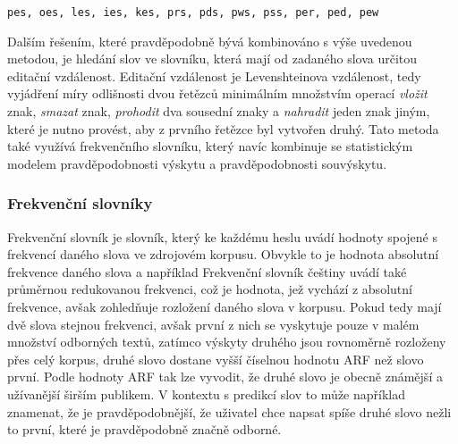 \documentclass[a4paper,11pt]{article}
\begin{document}
{\tt pes, oes, les, ies, kes, prs, pds, pws, pss, per, ped, pew}

Dalším řešením, které pravděpodobně bývá kombinováno s výše uvedenou metodou, je hledání slov ve slovníku, která mají od zadaného slova určitou editační vzdálenost. Editační vzdálenost je Levenshteinova vzdálenost, tedy vyjádření míry odlišnosti dvou řetězců minimálním množstvím operací {\it vložit} znak, {\it smazat} znak, {\it prohodit} dva sousední znaky a {\it nahradit} jeden znak jiným, které je nutno provést, aby z prvního řetězce byl vytvořen druhý. \parencite{levenshtein-en1966} \nocite{levenshtein1965}  %
Tato metoda také využívá frekvenčního slovníku, který navíc kombinuje se statistickým modelem pravděpodobnosti výskytu a pravděpodobnosti souvýskytu. \parencite{peternorvig} %

\subsubsection{Frekvenční slovníky}\label{frecdic}

Frekvenční slovník je slovník, který ke každému heslu uvádí hodnoty spojené s frekvencí daného slova ve zdrojovém korpusu. Obvykle to je hodnota absolutní frekvence daného slova a například Frekvenční slovník češtiny %
uvádí také průměrnou redukovanou frekvenci, což je hodnota, jež vychází z absolutní frekvence, avšak zohledňuje rozložení daného slova v korpusu. Pokud tedy mají dvě slova stejnou frekvenci, avšak první z nich se vyskytuje pouze v malém množství odborných textů, zatímco výskyty druhého jsou rovnoměrně rozloženy přes celý korpus, druhé slovo dostane vyšší číselnou hodnotu ARF než slovo první. Podle hodnoty ARF tak lze vyvodit, že druhé slovo je obecně známější a užívanější širším publikem. \cite{vcermak2004frekvenvcni} %
V kontextu s predikcí slov to může například znamenat, že je pravděpodobnější, že uživatel chce napsat spíše druhé slovo nežli to první, které je pravděpodobně značně odborné.
\end{document}
